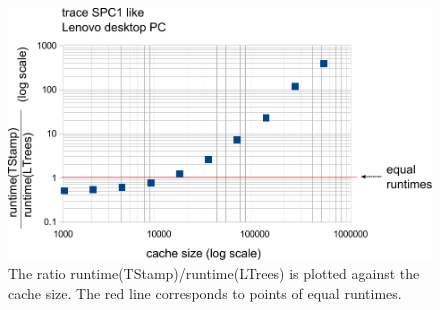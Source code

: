 \documentclass[a4paper,12pt, titlepage]{article}  %
\begin{document}
\begin{figure}[p]
	\centering
	\includegraphics[scale=0.8]{./experiments/lenovo_SPC1.pdf}
	\caption{The ratio runtime(TStamp)/runtime(LTrees) is plotted against the cache size.
                     The red line corresponds to points of equal runtimes.} 
	\label{fig:lenovo_SPC1}
\end{figure}
\end{document}
